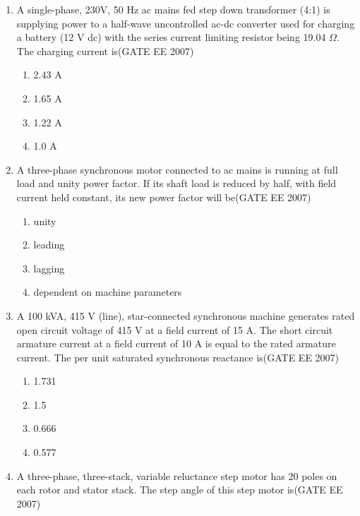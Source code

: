 \documentclass[a4paper,10pt]{exam}
\theoremstyle{remark}
\begin{document}
\begin{enumerate}
\item \quad A single-phase, 230V, 50 Hz ac mains fed step down transformer (4:1) is supplying power to a half-wave uncontrolled ac-dc converter used for charging a battery (12 V dc) with the series current limiting resistor being 19.04 $\Omega$. The charging current is\hfill{(GATE EE 2007)} 

\begin{multicols}{4}
\begin{enumerate}
\item 2.43 A
\item 1.65 A
\item1.22 A
\item 1.0 A
 \end{enumerate}
\end{multicols}

\item \quad A three-phase synchronous motor connected to ac mains is running at full load and unity power factor. If its shaft load is reduced by half, with field current held constant, its new power factor will be\hfill{(GATE EE 2007)} 

\begin{multicols}{4}
\begin{enumerate}
\item unity
\item leading
\item lagging
\item dependent on machine parameters
 \end{enumerate}
\end{multicols}

\item \quad A 100 kVA, 415 V (line), star-connected synchronous machine generates rated open circuit voltage of 415 V at a field current of 15 A. The short circuit armature current at a field current of 10 A is equal to the rated armature current. The per unit saturated synchronous reactance is\hfill{(GATE EE 2007)} 

\begin{multicols}{4}
\begin{enumerate}
 \item  1.731
 \item  1.5
 \item  0.666
 \item  0.577
 \end{enumerate}
\end{multicols}

\item \quad A three-phase, three-stack, variable reluctance step motor has 20 poles on each rotor and stator stack. The step angle of this step motor is\hfill{(GATE EE 2007)} 


\end{enumerate}
\end{document}
